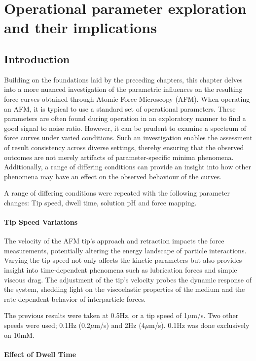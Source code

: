 \chapter{Operational parameter exploration and their implications}

\section{Introduction}

Building on the foundations laid by the preceding chapters, this chapter delves into a more nuanced investigation of the parametric influences on the resulting force curves obtained through Atomic Force Microscopy (AFM). When operating an AFM, it is typical to use a standard set of operational parameters. \cite{Schirmeisen2007} These parameters are often found during operation in an exploratory manner to find a good signal to noise ratio. However, it can be prudent  to examine a spectrum of force curves under varied conditions. Such an investigation enables the assessment of result consistency across diverse settings, thereby ensuring that the observed outcomes are not merely artifacts of parameter-specific minima phenomena. Additionally, a range of differing conditions can provide an insight into how other phenomena may have an effect on the observed behaviour of the curves.

A range of differing conditions were repeated with the following parameter changes: Tip speed, dwell time, solution pH and force mapping. 

\subsubsection{Tip Speed Variations}
The velocity of the AFM tip's approach and retraction impacts the force measurements, potentially altering the energy landscape of particle interactions. Varying the tip speed not only affects the kinetic parameters but also provides insight into time-dependent phenomena such as lubrication forces and simple viscous drag. The adjustment of the tip's velocity probes the dynamic response of the system, shedding light on the viscoelastic properties of the medium and the rate-dependent behavior of interparticle forces.

The previous results were taken at 0.5Hz, or a tip speed of 1$\mu$m/s. Two other speeds were used; 0.1Hz (0.2$\mu$m/s) and 2Hz (4$\mu$m/s). 0.1Hz was done exclusively on 10mM.

\subsubsection{Effect of Dwell Time}

